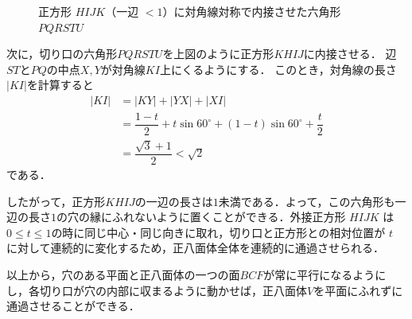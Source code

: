 \documentclass[../../main.tex]{subfiles}
\begin{document}
\begin{figure}[htb]
  \caption{正方形 $HIJK$（一辺 $<1$）に対角線対称で内接させた六角形 $PQRSTU$}
  \label{fig:hexagon_in_square}
\end{figure}

次に，切り口の六角形$PQRSTU$を上図のように正方形$KHIJ$に内接させる．
辺$ST$と$PQ$の中点$X,Y$が対角線$KI$上にくるようにする．
このとき，対角線の長さ$|KI|$を計算すると
\begin{align}
  |KI|
  &= |KY| + |YX| + |XI| \\
  &=\dfrac{1-t}{2}+t\sin60^\circ
  +(1-t)\sin60^\circ+\dfrac{t}{2}\\
  &=\dfrac{\sqrt{3}+1}{2}<\sqrt{2}
\end{align}
である．

したがって，正方形$KHIJ$の一辺の長さは$1$未満である．よって，この六角形も一辺の長さ$1$の穴の縁にふれないように置くことができる．外接正方形 $HIJK$ は$0 \le t \le 1$の時に同じ中心・同じ向きに取れ，切り口と正方形との相対位置が $t$ に対して連続的に変化するため，正八面体全体を連続的に通過させられる．

以上から，穴のある平面と正八面体の一つの面$BCF$が常に平行になるようにし，各切り口が穴の内部に収まるように動かせば，正八面体$V$を平面にふれずに通過させることができる．
\end{document}

